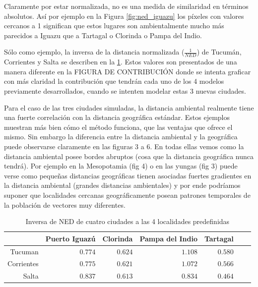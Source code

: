   \par Claramente por estar normalizada, no es una medida de similaridad en
    términos absolutos. Así por ejemplo en la Figura \ref{fig:ned_iguazu} los
    píxeles con valores
    cercanos a 1 significan que estos lugares son ambientalmente mucho más
    parecidos a Iguazu que a Tartagal o Clorinda o Pampa del Indio.


  \par Sólo como ejemplo, la inversa de la distancia normalizada ($\frac{1}{NED}$)
    de Tucumán, Corrientes y Salta se describen en la \ref{Tab:comparacion_ned}.
    Estos valores son presentados de una manera diferente en la FIGURA DE CONTRIBUCIÓN
    donde se intenta graficar con más claridad la contribución que tendrán cada
    uno de los 4 modelos previamente desarrollados, cuando se intenten modelar
    estas 3 nuevas ciudades.

  \par Para el caso de las tres ciudades simuladas, la distancia ambiental
    realmente tiene una fuerte correlación con la distancia geográfica estándar.
    Estos ejemplos muestran más bien cómo el método funciona, que las ventajas
    que ofrece el mismo. Sin embargo la diferencia entre la distancia ambiental
    y la geográfica puede observarse claramente en las figuras 3 a 6.
    En todas ellas vemos como la distancia ambiental posee bordes abruptos
    (cosa que la distancia geográfica nunca tendrá).
    Por ejemplo en la Mesopotamia (fig 4) o en las yungas (fig 3) puede verse
    como pequeñas distancias geográficas tienen asociadas fuertes gradientes en
    la distancia ambiental (grandes distancias ambientales) y por ende
    podríamos suponer que localidades cercanas geográficamente posean patrones
    temporales de la población de vectores muy diferentes.

    \begin{table}[hbt]
    \centering
    \caption{Inversa de NED de cuatro ciudades a las 4 localidades predefinidas}\label{Tab:comparacion_ned}
    \begin{tabular}{*7{r}}
    \toprule
    & Puerto Iguazú
    & Clorinda
    & Pampa del Indio
    & Tartagal \\ \midrule
    Tucuman
    &$0.774$
    &$0.624$
    &$1.108$%
    &$0.580$\\
    Corrientes
    &$0.775$
    &$0.621$
    &$1.072$
    &$0.566$ \\
    Salta
    &$0.837$
    &$0.613$
    &$0.834$   %
    &$0.464$ \\
    \bottomrule
    \end{tabular}
    \end{table}

